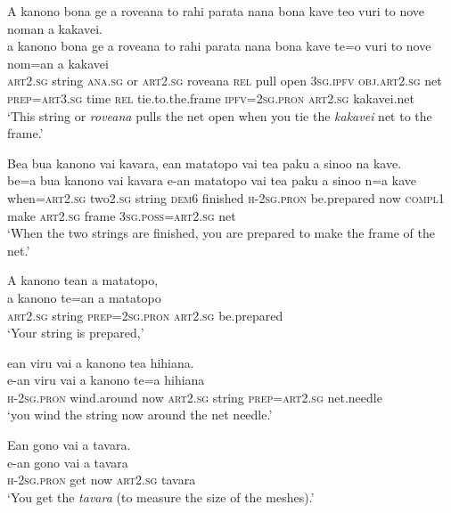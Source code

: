 \largerpage
\ea\label{ex:text22-56}
A kanono bona ge a roveana to rahi parata nana bona kave teo vuri to nove noman a kakavei.\\
\gll a	kanono	bona	ge	a	roveana	to	rahi	parata	nana	bona	kave	te=o	vuri	to	nove	nom=an	a	kakavei\\
     \textsc{art}2.\textsc{sg}	string	\textsc{ana}.\textsc{sg}	or	\textsc{art}2.\textsc{sg}	roveana	\textsc{rel}	pull	open	3\textsc{sg}.\textsc{ipfv}	\textsc{obj}.\textsc{art}2.\textsc{sg}	net	\textsc{prep}=\textsc{art}3.\textsc{sg}	time	\textsc{rel}	tie.to.the.frame	\textsc{ipfv}=2\textsc{sg}.\textsc{pron}	\textsc{art}2.\textsc{sg}	kakavei.net\\
\glt `This string or \textit{roveana} pulls the net open when you tie the \textit{kakavei} net to the frame.'
\z\clearpage

\ea\label{ex:text22-57}
Bea bua kanono vai kavara, ean matatopo vai tea paku a sinoo na kave.\\
\gll be=a	bua	kanono	vai	kavara	e-an	matatopo	vai	tea	paku	a	sinoo	n=a	kave\\
     when=\textsc{art}2.\textsc{sg}	two2.\textsc{sg}	string	\textsc{dem}6	finished	\textsc{h}-2\textsc{sg}.\textsc{pron}	be.prepared	now	\textsc{compl}1	make	\textsc{art}2.\textsc{sg}	frame	3\textsc{sg}.\textsc{poss}=\textsc{art}2.\textsc{sg}	net\\
\glt `When the two strings are finished, you are prepared to make the frame of the net.'
\z

\ea\label{ex:text22-58}
A kanono tean a matatopo,\\
\gll a	kanono	te=an	a	matatopo\\
     \textsc{art}2.\textsc{sg}	string	\textsc{prep}=2\textsc{sg}.\textsc{pron}	\textsc{art}2.\textsc{sg}	be.prepared\\
\glt `Your string is prepared,'
\z

\ea\label{ex:text22-59}
ean viru vai a kanono tea hihiana.\\
\gll e-an	viru	vai	a	kanono	te=a	hihiana\\
     \textsc{h}-2\textsc{sg}.\textsc{pron}	wind.around	now	\textsc{art}2.\textsc{sg}	string	\textsc{prep}=\textsc{art}2.\textsc{sg}	net.needle\\
\glt `you wind the string now around the net needle.'
\z

\ea\label{ex:text22-60}
Ean gono vai a tavara.\\
\gll e-an	gono	vai	a	tavara\\
     \textsc{h}-2\textsc{sg}.\textsc{pron}	get	now	\textsc{art}2.\textsc{sg}	tavara\\
\glt `You get the \textit{tavara} (to measure the size of the meshes).'
\z

